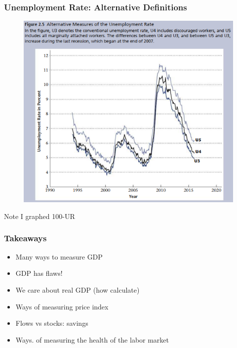 \documentclass{beamer}
\begin{document}
\begin{frame}
\frametitle[alignment=center]{Unemployment Rate: Alternative Definitions}
\begin{figure}
\includegraphics[scale=0.5]{Figures/W_Fig_2pt5.png}
\end{figure}
Note I graphed 100-UR
\end{frame}




\begin{frame}
\frametitle[alignment=center]{Takeaways}
\begin{itemize}
\item Many ways to measure GDP
\item GDP has flaws!
\item We care about real GDP (how calculate)
\item Ways of measuring price index
\item Flows vs stocks: savings
\item  Ways. of measuring the health of the labor market
\end{itemize}
\end{frame}
\end{document}
